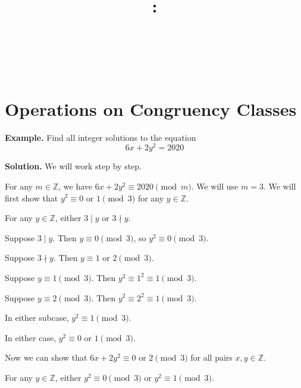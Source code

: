 \documentclass{article}
\title{
    \vspace{2in}
    \textbf{\lectClass:\\ \lectTitle}\\
    \vspace{0.1in}\large{\textit{\lectClassInstructor\ \lectSection}}
    \vspace{3in}
    \author{\textbf{\lectAuthorName}}
    \date{}
}
\begin{document}
\maketitle
\pagebreak

\section*{Operations on Congruency Classes}
    \textbf{Example. } Find all integer solutions to the equation $$6x + 2y^{2} = 2020$$
    
    \vspace{1.5mm}\textbf{Solution.}
    We will work step by step.
    \begin{enumerate}[label = \arabic*.]
        \item For any $m \in \mathbb{Z}$, we have $6x + 2y^2 \equiv 2020 \pmod{m}$. We will use $m = 3$. We will first show that $y^{2} \equiv 0$ or $1 \pmod{3}$ for any $y \in \mathbb{Z}$.
        
        \vspace{1.5mm}
        For any $y \in \mathbb{Z}$, either $3 \mid y$ or $3 \nmid y$.
        \begin{Cases}
            \item Suppose $3 \mid y$. Then $y \equiv 0 \pmod{3}$, so $y^{2} \equiv 0 \pmod{3}$.
            \item Suppose $3 \nmid y$. Then $y \equiv 1 \text{ or } 2 \pmod{3}$.
            
            \begin{Cases}[label* = \arabic*., itemindent = .6in, topsep = 0.04in]
                \item Suppose $y \equiv 1 \pmod{3}$. Then $y^{2} \equiv 1^2 \equiv 1 \pmod{3}$. 
                \item Suppose $y \equiv 2 \pmod{3}$. Then $y^{2} \equiv 2^{2} \equiv 1 \pmod{3}$.
            \end{Cases}
            In either subcase, $y^{2} \equiv 1 \pmod{3}$.
        \end{Cases}
        In either case, $y^{2} \equiv 0$ or $1 \pmod{3}$.
        
        \item Now we can show that $6x + 2y^2 \equiv 0$ or $2 \pmod{3}$ for all pairs $x, y \in \mathbb{Z}$.
        
        \vspace{1.5mm}
        For any $y \in \mathbb{Z}$, either $y^{2} \equiv 0 \pmod{3}$ or $y^{2} \equiv 1 \pmod{3}$.
        

\end{enumerate}
\end{document}
